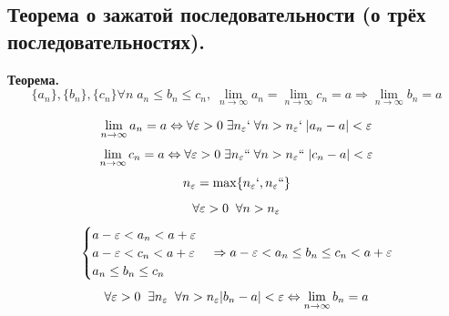 \subsection{Теорема о зажатой последовательности (о трёх последовательностях).}

\begin{tcolorbox}
	\textbf{Теорема.} 
	\[ \{a_n\},\{b_n\},\{c_n\} \forall n\; a_n\leq b_n\leq c_n,\; \lim_{n\to \infty} a_n = \lim_{n\to \infty} c_n = a \Rightarrow \lim_{n\to \infty} b_n = a \]
\end{tcolorbox}
\begin{tcolorbox}[title=Доказательство]
	\[ \lim_{n\to\infty} a_n = a \Leftrightarrow \forall \varepsilon > 0\; \exists n_\varepsilon` \; \forall n > n_\varepsilon` \; |a_n - a| < \varepsilon \] 
	\[ \lim_{n\to\infty} c_n = a \Leftrightarrow \forall \varepsilon > 0\; \exists n_\varepsilon`` \; \forall n > n_\varepsilon`` \; |c_n - a| < \varepsilon \] 
	\[ n_\varepsilon = \max\{ n_\varepsilon`, n_\varepsilon``\} \]
	\[ \forall \varepsilon > 0\;\; \forall n > n_\varepsilon \]
	\[ 
	\begin{cases}
		a - \varepsilon < a_n < a + \varepsilon\\
		a - \varepsilon < c_n < a + \varepsilon\\
		a_n \leq b_n \leq c_n 
	\end{cases} \Rightarrow 
	a - \varepsilon < a_n \leq b_n \leq c_n < a + \varepsilon 
	\]
	\[ \forall \varepsilon > 0\;\; \exists n_\varepsilon \;\; \forall n > n_\varepsilon |b_n - a| <\varepsilon \Leftrightarrow \lim_{n\to \infty} b_n = a \]
\end{tcolorbox}
